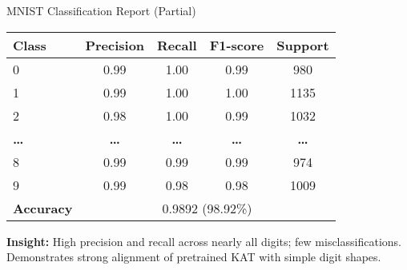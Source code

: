 \documentclass{beamer}
\begin{document}
\begin{frame}{MNIST Classification Report (Partial)}
    \small
    \centering
    \begin{tabular}{lcccc}
        \toprule
        \textbf{Class}    & \textbf{Precision} & \textbf{Recall} & \textbf{F1-score} & \textbf{Support} \\
        \midrule
        0                 & 0.99               & 1.00            & 0.99              & 980              \\
        1                 & 0.99               & 1.00            & 1.00              & 1135             \\
        2                 & 0.98               & 1.00            & 0.99              & 1032             \\
        \textbf{\ldots}      & \textbf{\ldots}       & \textbf{\ldots}    & \textbf{\ldots}      & \textbf{\ldots}     \\
        8                 & 0.99               & 0.99            & 0.99              & 974              \\
        9                 & 0.99               & 0.98            & 0.98              & 1009             \\
        \midrule
        \textbf{Accuracy} & \multicolumn{4}{c}{0.9892 (98.92\%)} \\
        \bottomrule
    \end{tabular}
    
    \vspace{1em}
    \textbf{Insight:} High precision and recall across nearly all digits; few misclassifications. Demonstrates strong alignment of pretrained KAT with simple digit shapes.
\end{frame}
\end{document}
